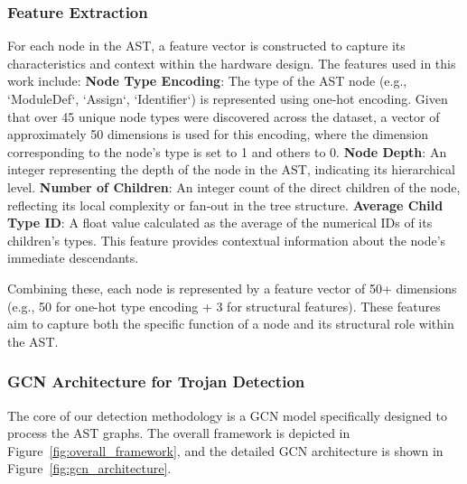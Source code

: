 \documentclass[sigplan,screen]{acmart}
\newcommand{\circled}[1]{%
  \tikz[baseline=(char.base)]{
    \node[shape=circle, fill=black, text=white, inner sep=1pt, minimum size=1.5em] (char) {#1};
  }%
}
\begin{document}
\subsubsection{Feature Extraction}
For each node in the AST, a feature vector is constructed to capture its characteristics and context within the hardware design. The features used in this work include:
\circled{1} \textbf{Node Type Encoding}: The type of the AST node (e.g., `ModuleDef`, `Assign`, `Identifier`) is represented using one-hot encoding. Given that over 45 unique node types were discovered across the dataset, a vector of approximately 50 dimensions is used for this encoding, where the dimension corresponding to the node's type is set to 1 and others to 0.
\circled{2} \textbf{Node Depth}: An integer representing the depth of the node in the AST, indicating its hierarchical level.
\circled{3} \textbf{Number of Children}: An integer count of the direct children of the node, reflecting its local complexity or fan-out in the tree structure.
\circled{4} \textbf{Average Child Type ID}: A float value calculated as the average of the numerical IDs of its children's types. This feature provides contextual information about the node's immediate descendants.

Combining these, each node is represented by a feature vector of 50+ dimensions (e.g., 50 for one-hot type encoding + 3 for structural features). These features aim to capture both the specific function of a node and its structural role within the AST.

\subsubsection{GCN Architecture for Trojan Detection}
The core of our detection methodology is a GCN model specifically designed to process the AST graphs. The overall framework is depicted in Figure~\ref{fig:overall_framework}, and the detailed GCN architecture is shown in Figure~\ref{fig:gcn_architecture}.

\end{document}
